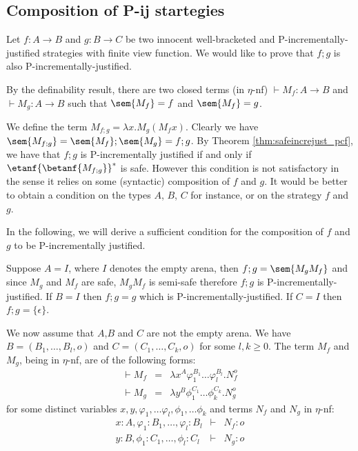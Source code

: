 \subsection{Composition of P-ij startegies}

Let $f:A\rightarrow B$ and $g:B\rightarrow C$ be two innocent well-bracketed and P-incrementally-justified strategies with finite view function.
We would like to prove that $f;g$ is also P-incrementally-justified.

By the definability result, there are two closed terms (in $\eta$-nf) $\vdash M_f :A\rightarrow B$  and $\vdash M_g :A\rightarrow B$ such that $\sem{M_f} = f$
and $\sem{M_f} = g$.

We define the term $M_{f;g} = \lambda x . M_g (M_f x)$. Clearly we have $\sem{M_{f;g}} = \sem{M_f} ; \sem{M_g} = f;g$. By Theorem \ref{thm:safeincrejust_pcf}, we have that $f;g$ is P-incrementally justified if and only if $\etanf{\betanf{M_{f;g}}}^*$ is safe. However this condition is not satisfactory in the sense it relies on some (syntactic) composition of $f$ and $g$. It would be better to obtain a condition on the types $A$, $B$, $C$ for instance, or on the strategy $f$ and $g$.

In the following, we will derive a sufficient condition for the composition of $f$ and $g$ to be P-incrementally justified.


Suppose $A=I$, where $I$ denotes the empty arena, then $f;g = \sem{M_g M_f}$ and since $M_g$ and $M_f$ are safe, $M_g M_f$ is semi-safe therefore $f;g$ is P-incrementally-justified.
If $B=I$ then $f;g = g$ which is P-incrementally-justified.
If $C=I$ then $f;g = \{ \epsilon \}$.

We now assume that $A$,$B$ and $C$ are not the empty arena. We have $B=(B_1,\ldots,B_l,o)$ and $C=(C_1,\ldots,C_k,o)$ for some $l,k\geq 0$. The term $M_f$ and $M_g$, being in $\eta$-nf, are of the following forms:
\begin{eqnarray*}
\vdash M_f &=& \lambda x^A \varphi_1^{B_1} \ldots \varphi_l^{B_l} . N_f^o\\
\vdash  M_g &=& \lambda y^B \phi_1^{C_1} \ldots \phi_k^{C_k} . N_g^o
\end{eqnarray*}
for some distinct variables $x,y,\varphi_1, \dots \varphi_l, \phi_1, \dots \phi_k$ and
terms $N_f$ and $N_g$ in $\eta$-nf:
\begin{eqnarray*}
x:A, \varphi_1:B_1, \dots, \varphi_l:B_l &\vdash& N_f :o \\
y:B, \phi_1:C_1, \dots, \phi_l:C_l &\vdash& N_g :o
\end{eqnarray*}


